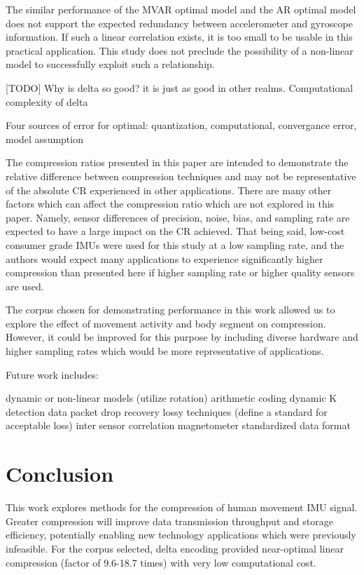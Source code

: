 \documentclass[journal]{IEEEtran}
\begin{document}
The similar performance of the MVAR optimal model and the AR optimal model does not support the expected redundancy between accelerometer and gyroscope information. If such a linear correlation exists, it is too small to be usable in this practical application. This study does not preclude the possibility of a non-linear model to successfully exploit such a relationship.

[TODO] Why is delta so good? it is just as good in other realms. Computational complexity of delta

Four sources of error for optimal: quantization, computational, convergance error, model assumption

The compression ratios presented in this paper are intended to demonstrate the relative difference between compression techniques and may not be representative of the absolute CR experienced in other applications. There are many other factors which can affect the compression ratio which are not explored in this paper. Namely, sensor differences of precision, noise, bias, and sampling rate are expected to have a large impact on the CR achieved. That being said, low-cost consumer grade IMUs were used for this study at a low sampling rate, and the authors would expect many applications to experience significantly higher compression than presented here if higher sampling rate or higher quality sensors are used.

The corpus chosen for demonstrating performance in this work allowed us to explore the effect of movement activity and body segment on compression. However, it could be improved for this purpose by including diverse hardware and higher sampling rates which would be more representative of applications.

Future work includes:

dynamic or non-linear models (utilize rotation)
arithmetic coding
dynamic K detection
data packet drop recovery
lossy techniques (define a standard for acceptable loss)
inter sensor correlation
magnetometer
standardized data format

\section{Conclusion}
This work explores methods for the compression of human movement IMU signal. Greater compression will improve data transmission throughput and storage efficiency, potentially enabling new technology applications which were previously infeasible. For the corpus selected, delta encoding provided near-optimal linear compression (factor of 9.6-18.7 times) with very low computational cost.
\end{document}
